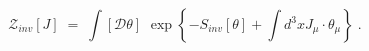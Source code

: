 \begin{equation}\label{eq:defzinv}
{\mathcal Z}_{inv}[J] \;=\; \int [{\mathcal D}\theta] \,
\,\exp \left\{- S_{inv}[\theta] + \int d^3x J_\mu \cdot \theta_\mu \right\} \;.
\end{equation}

